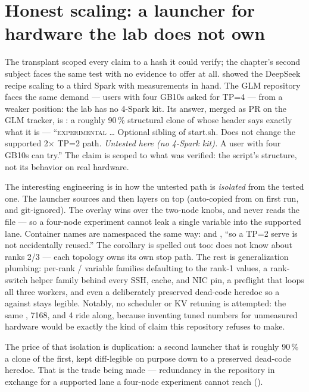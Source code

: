 \section{Honest scaling: a launcher for hardware the lab does not own}

The transplant scoped every claim to a hash it could verify; the chapter's
second subject faces the same test with no evidence to offer at all.
 showed the DeepSeek recipe scaling to a third Spark with
measurements in hand. The GLM repository faces the same demand --- users with four
GB10s asked for TP=4 --- from a weaker position: the lab has no 4-Spark kit.
Its answer, merged as PR  on the GLM tracker, is
: a roughly 90\,\% structural clone of
 whose header says exactly what it is ---
``\textsc{experimental} \ldots{} Optional sibling of start.sh. Does not
change the supported 2$\times$ TP=2 path. \emph{Untested here (no 4-Spark
kit).} A user with four GB10s can try.'' The claim is scoped to what was
verified: the script's structure, not its behavior on real hardware.

The interesting engineering is in how the untested path is \emph{isolated}
from the tested one. The launcher sources  and then layers
 on top (auto-copied from  on
first run, and git-ignored). The overlay wins over the two-node knobs, and
 never reads the file --- so a four-node experiment
cannot leak a single variable into the supported lane. Container names are
namespaced the same way:  and ,
``so a TP=2 serve is not accidentally reused.'' The corollary is spelled
out too:  does not know about ranks 2/3 --- each
topology owns its own stop path. The rest is generalization plumbing:
per-rank  /  variable families
defaulting to the rank-1 values, a rank-switch helper family behind every
SSH, cache, and NIC pin, a preflight that loops all three workers, and even
a deliberately preserved dead-code heredoc so a  against
 stays legible. Notably, no scheduler or KV retuning is
attempted: the same
,  7168, and  4
ride along, because inventing tuned numbers for unmeasured hardware would
be exactly the kind of claim this repository refuses to make.

The price of that isolation is duplication: a second launcher that is roughly
90\,\% a clone of the first, kept diff-legible on purpose down to a preserved
dead-code heredoc. That is the trade being made --- redundancy in the
repository in exchange for a supported lane a four-node experiment cannot
reach ().

